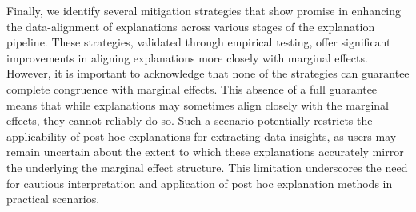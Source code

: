 \documentclass[mnsc,blindrev]{informs3}
\begin{document}
        
         Finally, we identify several mitigation strategies that show promise in enhancing the data-alignment of explanations across various stages of the explanation pipeline. These strategies, validated through empirical testing, offer significant improvements in aligning explanations more closely with marginal effects. However, it is important to acknowledge that none of the strategies can guarantee complete congruence with marginal effects. This absence of a full guarantee means that while explanations may sometimes align closely with the marginal effects, they cannot reliably do so. Such a scenario potentially restricts the applicability of post hoc explanations for extracting data insights, as users may remain uncertain about the extent to which these explanations accurately mirror the underlying the marginal effect structure. This limitation underscores the need for cautious interpretation and application of post hoc explanation methods in practical scenarios.
        
        

            



        
\end{document}

